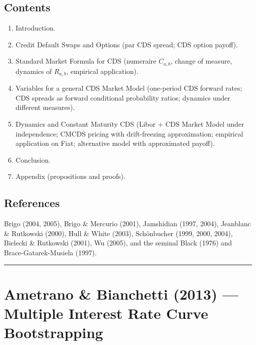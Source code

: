 \documentclass[11pt,a4paper]{article}
\begin{document}
\subsection*{Contents}
\begin{enumerate}[noitemsep]
  \item Introduction.
  \item Credit Default Swaps and Options (par CDS spread; CDS option payoff).
  \item Standard Market Formula for CDS (numeraire $C_{a,b}$, change of measure, dynamics of $R_{a,b}$, empirical application).
  \item Variables for a general CDS Market Model (one-period CDS forward rates; CDS spreads as forward conditional probability ratios; dynamics under different measures).
  \item Dynamics and Constant Maturity CDS (Libor + CDS Market Model under independence; CMCDS pricing with drift-freezing approximation; empirical application on Fiat; alternative model with approximated payoff).
  \item Conclusion.
  \item Appendix (propositions and proofs).
\end{enumerate}

\subsection*{References}
Brigo (2004, 2005), Brigo \& Mercurio (2001), Jamshidian (1997, 2004),
Jeanblanc \& Rutkowski (2000), Hull \& White (2003), Schönbucher
(1999, 2000, 2004), Bielecki \& Rutkowski (2001), Wu (2005), and
the seminal Black (1976) and Brace-Gatarek-Musiela (1997).

\bigskip\hrule\bigskip

\section{Ametrano \& Bianchetti (2013) --- Multiple Interest Rate Curve Bootstrapping}
\label{bib:ametrano-bianchetti-2013}
\end{document}
